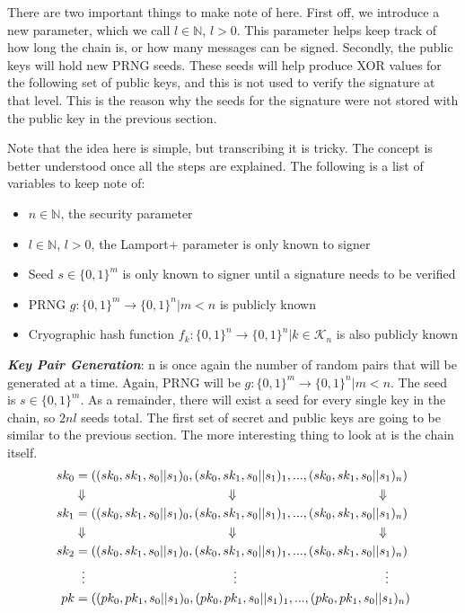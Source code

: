 \documentclass[]{scrartcl}
\makeatletter
\newcommand{\mathcenter}{\@fleqnfalse}
\makeatother
\begin{document}
There are two important things to make note of here. First off, we introduce a new parameter, which we call $l \in \mathbb{N}$, $l > 0$. This parameter helps keep track of how long the chain is, or how many messages can be signed. Secondly, the public keys will hold new PRNG seeds. These seeds will help produce XOR values for the following set of public keys, and this is not used to verify the signature at that level. This is the reason why the seeds for the signature were not stored with the public key in the previous section.

Note that the idea here is simple, but transcribing it is tricky. The concept is better understood once all the steps are explained. The following is a list of variables to keep note of:
\begin{itemize}
	\item $n \in \mathbb{N}$, the security parameter 
	\item $l \in \mathbb{N}$, $l > 0$, the Lamport+ parameter is only known to signer
	\item Seed $s \in \{0,1\}^m$ is only known to signer until a signature needs to be verified
	\item PRNG $g : \{0,1\}^m \rightarrow \{0,1\}^n | m < n$ is publicly known
	\item Cryographic hash function $f_k : \{0,1\}^n \rightarrow \{0,1\}^n | k \in \mathcal{K}_n$ is also publicly known
\end{itemize}
\textbf{\textit{Key Pair Generation}}: n is once again the number of random pairs that will be generated at a time. Again, PRNG will be $g : \{0,1\}^m \rightarrow \{0,1\}^n | m < n$. The seed is $s \in \{0,1\}^m$. As a remainder, there will exist a seed for every single key in the chain, so $2nl$ seeds total. The first set of secret and public keys are going to be similar to the previous section. The more interesting thing to look at is the chain itself.
\mathcenter
\begin{equation}
\begin{split}
sk_0 & = ((sk_0, sk_1, s_0||s_1)_0,(sk_0, sk_1, s_0||s_1)_1,...,(sk_0, sk_1, s_0||s_1)_n)\\
& \Downarrow \hspace{4cm}\Downarrow \hspace{4cm}\Downarrow \\
sk_1 & = ((sk_0, sk_1, s_0||s_1)_0,(sk_0, sk_1, s_0||s_1)_1,...,(sk_0, sk_1, s_0||s_1)_n) \\
& \Downarrow \hspace{4cm}\Downarrow \hspace{4cm}\Downarrow \\
sk_2 & = ((sk_0, sk_1, s_0||s_1)_0,(sk_0, sk_1, s_0||s_1)_1,...,(sk_0, sk_1, s_0||s_1)_n) \\
& \hspace{0.2cm}\vdots \hspace{4.15cm}\vdots \hspace{4.15cm}\vdots \\
pk & = ((pk_0, pk_1, s_0||s_1)_0,(pk_0, pk_1, s_0||s_1)_1,...,(pk_0, pk_1, s_0||s_1)_n) \\
\end{split}
\end{equation}
\end{document}
